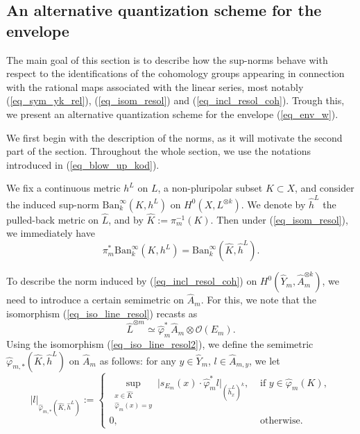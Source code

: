 \documentclass[12pt]{article}
\numberwithin{equation}{section}
\theoremstyle{theorem}
\theoremstyle{definition}
\theoremstyle{remark}
\begin{document}
	\subsection{An alternative quantization scheme for the envelope}\label{sect_alt_q_sch}
	The main goal of this section is to describe how the sup-norms behave with respect to the identifications of the cohomology groups appearing in connection with the rational maps associated with the linear series, most notably (\ref{eq_sym_yk_rel}), (\ref{eq_isom_resol}) and (\ref{eq_incl_resol_coh}).
	Trough this, we present an alternative quantization scheme for the envelope (\ref{eq_env_w}).
	\par 
	We first begin with the description of the norms, as it will motivate the second part of the section. 
	Throughout the whole section, we use the notations introduced in (\ref{eq_blow_up_kod}).
	\par 
	We fix a continuous metric $h^L$ on $L$, a non-pluripolar subset $K \subset X$, and consider the induced sup-norm $\textrm{Ban}_k^{\infty}(K, h^L)$ on $H^0(X, L^{\otimes k})$.
	We denote by $\widehat{h}^L$ the pulled-back metric on $\widehat{L}$, and by $\widehat{K} := \pi_m^{-1}(K)$.
	Then under (\ref{eq_isom_resol}), we immediately have
	\begin{equation}
		\pi_m^* \textrm{Ban}_k^{\infty}(K, h^L)
		=
		\textrm{Ban}_k^{\infty}(\widehat{K}, \widehat{h}^L).
	\end{equation}
	\par 
	To describe the norm induced by (\ref{eq_incl_resol_coh}) on $H^0(\widehat{Y}_m, \widehat{A}_m^{\otimes k})$, we need to introduce a certain semimetric on $\widehat{A}_m$.
	For this, we note that the isomorphism (\ref{eq_iso_line_resol}) recasts as 
	\begin{equation}\label{eq_iso_line_resol2}
		\widehat{L}^{\otimes m} \simeq \widehat{\varphi}_m^* \widehat{A}_m \otimes \mathscr{O}(E_m).
	\end{equation}
	Using the isomorphism (\ref{eq_iso_line_resol2}), we define the semimetric $\widehat{\varphi}_{m, *} (\widehat{K}, \widehat{h}^L)$ on $\widehat{A}_m$ as follows: for any $y \in \widehat{Y}_m$, $l \in \widehat{A}_{m, y}$, we let 
	\begin{equation}\label{eq_max_metric}
		|l|_{\widehat{\varphi}_{m, *} (\widehat{K}, \widehat{h}^L)} 
		:=
		\begin{cases}
			\sup_{\substack{x \in \widehat{K} \\ \widehat{\varphi}_m(x) = y}} \big| s_{E_m}(x) \cdot \widehat{\varphi}_m^* l \big|_{(\widehat{h}^L_x)^k},
			&
			\text{ if } y \in \widehat{\varphi}_m(K),
			\\
			0, &
			\text{ otherwise.} 
		\end{cases}		
	\end{equation}
\end{document}
